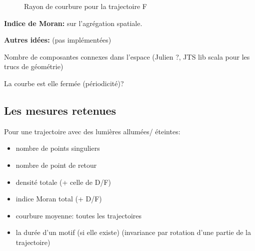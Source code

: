 \documentclass[11pt,a4paper]{article}
\begin{document}
\begin{figure}[H] 
\caption{Rayon de courbure pour la trajectoire F}
\label{mesure_ourbureF}
\end{figure}





\textbf{Indice de Moran:} sur l'agrégation spatiale.


\textbf{Autres idées:} (pas implémentées)

Nombre de composantes connexes dans l'espace (Julien ?, JTS lib scala pour les trucs de géométrie)

La courbe est elle fermée (périodicité)?



\subsection{Les mesures retenues}
Pour une trajectoire avec des lumières allumées/ éteintes:

\begin{itemize}
\item nombre de points singuliers
\item nombre de point de retour
\item densité totale (+ celle de D/F)
\item indice Moran total (+ D/F)
\item courbure moyenne: toutes les trajectoires
\item la durée d'un motif (si elle existe) (invariance par rotation d'une partie de la trajectoire) 
\end{itemize}
\end{document}
